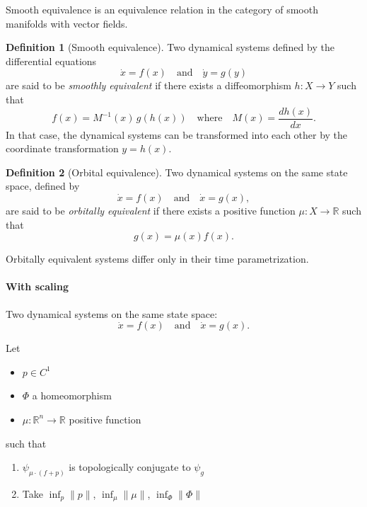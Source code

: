 \documentclass{article}
\theoremstyle{definition} \newtheorem{definition}{Definition}  \newtheorem{example}{Example}
\theoremstyle{remark} \newtheorem{remark}{Remark}
\newcounter{ct}
\newcommand{\field}[1]{\ensuremath{\mathbb{#1}}}
\newcommand{\reals}{\field{R}}
\begin{document}
Smooth equivalence is an equivalence relation in the category of smooth manifolds with vector fields. %
\begin{definition}[Smooth equivalence]\label{def:smooth_equivalence}
Two dynamical systems defined by the differential equations 
\[
\dot{x} = f(x) \quad \text{and} \quad \dot{y} = g(y)
\]
are said to be \emph{smoothly equivalent} if there exists a diffeomorphism \( h \colon X \to Y \) such that
\[
f(x) = M^{-1}(x) \, g(h(x)) \quad \text{where} \quad M(x) = \frac{d h(x)}{d x}.
\]
In that case, the dynamical systems can be transformed into each other by the coordinate transformation \( y = h(x) \).
\end{definition}

\begin{definition}[Orbital equivalence]
Two dynamical systems on the same state space, defined by 
\[
\dot{x} = f(x) \quad \text{and} \quad \dot{x} = g(x),
\]
are said to be \emph{orbitally equivalent} if there exists a positive function \( \mu \colon X \to \mathbb{R} \) such that
\[
g(x) = \mu(x) f(x).
\]
\end{definition}
Orbitally equivalent systems differ only in their time parametrization.


\paragraph{With scaling}
Two dynamical systems on the same state space:
\[
\dot{x} = f(x) \quad \text{and} \quad \dot{x} = g(x).
\]

Let 
\begin{itemize}
\item $p\in C^1$
\item $\Phi$ a homeomorphism
\item $\mu\colon \reals^n\rightarrow \reals$ positive function
\end{itemize}
such that 
\begin{enumerate}
\item $\psi_{\mu \cdot (f+p)}$ is topologically conjugate to $\psi_{g}$
\item Take $\inf_p \|p\|$, $\inf_\mu \|\mu\|$, $\inf_\Phi \|\Phi\|$
\end{enumerate}

\end{document}
